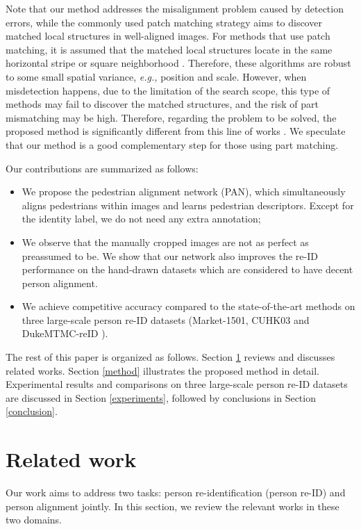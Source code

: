 Note that our method addresses the misalignment problem caused by detection errors, while the commonly used patch matching strategy aims to discover matched local structures in well-aligned images. For methods that use patch matching, 
it is assumed that the matched local structures locate in the same horizontal stripe \cite{li2014deepreid,yi2014deep,zhao2013person,zhao2014learning,liao2015person,cheng2016person} or square neighborhood \cite{ahmed2015improved}.
Therefore, these algorithms are robust to some small spatial variance, \emph{e.g.,} position and scale. However, when misdetection happens, due to the limitation of the search scope, this type of methods may fail to discover the matched structures, and the risk of part mismatching may be high. Therefore, regarding the problem to be solved, the proposed method is significantly different from this line of works \cite{li2014deepreid,yi2014deep,ahmed2015improved,zhao2013person,zhao2014learning,liao2015person,cheng2016person}. We speculate that our method is a good complementary step for those using part matching. 

Our contributions are summarized as follows:
\begin{itemize}
\item We propose the pedestrian alignment network (PAN), which simultaneously aligns pedestrians within images and learns pedestrian descriptors. Except for the identity label, we do not need any extra annotation;

\item We observe that the manually cropped images are not as perfect as preassumed to be. We show that our network also improves the re-ID performance on the hand-drawn datasets which are considered to have decent person alignment.

\item We achieve competitive accuracy compared to the state-of-the-art methods on three large-scale person re-ID datasets (Market-1501\cite{zheng2015scalable}, CUHK03 \cite{li2014deepreid} and DukeMTMC-reID \cite{zheng2017unlabeled}).
\end{itemize}


The rest of this paper is organized as follows. Section \ref{relatedwork} reviews and discusses related works. Section \ref{method} illustrates the proposed method in detail. Experimental results and comparisons on three large-scale person re-ID datasets are discussed in Section \ref{experiments}, followed by conclusions in Section \ref{conclusion}.

\section{Related work}  \label{relatedwork}
Our work aims to address two tasks: person re-identification (person re-ID) and person alignment jointly. In this section, we review the relevant works in these two domains. 

